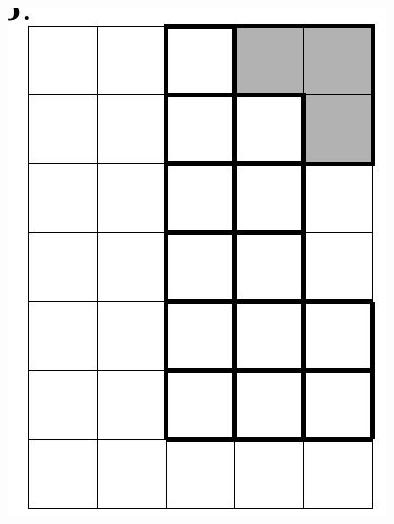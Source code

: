 \documentclass[10pt]{article}
\begin{document}
\includegraphics[max width=\textwidth, center]{2024_11_21_e9b4faa005d5be2cc318g-159}\\
\end{document}
